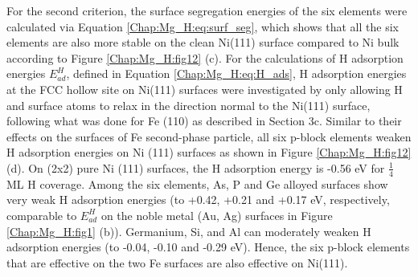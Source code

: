 For the second criterion, the surface segregation energies of the six elements were calculated via Equation \ref{Chap:Mg_H:eq:surf_seg}, which shows that all the six elements are also more stable on the clean Ni(111) surface compared to Ni bulk according to Figure \ref{Chap:Mg_H:fig12} (c). For the calculations of H adsorption energies $E_{ad}^H$, defined in Equation \ref{Chap:Mg_H:eq:H_ads}, H adsorption energies at the FCC hollow site on Ni(111) surfaces were investigated by only allowing H and surface atoms to relax in the direction normal to the Ni(111) surface, following what was done for Fe (110) as described in Section 3c. Similar to their effects on the surfaces of Fe second-phase particle, all six p-block elements weaken H adsorption energies on Ni (111) surfaces as shown in Figure \ref{Chap:Mg_H:fig12} (d). On (2x2) pure Ni (111) surfaces, the H adsorption energy is -0.56 eV for $\frac{1}{4}$ ML H coverage. Among the six elements, As, P and Ge alloyed surfaces show very weak H adsorption energies (to +0.42, +0.21 and +0.17 eV, respectively, comparable to $E_{ad}^H$ on the noble metal (Au, Ag) surfaces in Figure \ref{Chap:Mg_H:fig1} (b)). Germanium, Si, and Al can moderately weaken H adsorption energies (to -0.04, -0.10 and -0.29 eV). Hence, the six p-block elements that are effective on the two Fe surfaces are also effective on Ni(111).